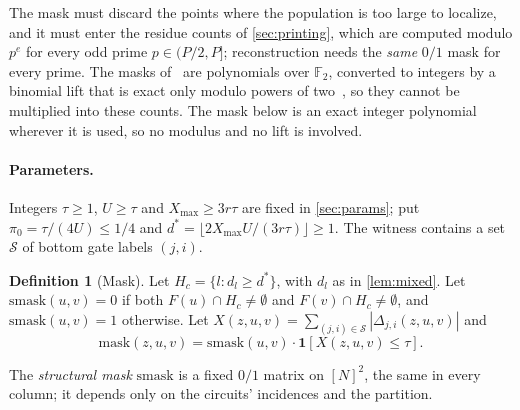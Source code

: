 \documentclass[11pt,letterpaper]{article}
\theoremstyle{definition}
\newtheorem{definition}{Definition}[section]
\theoremstyle{remark}
\newcommand{\F}{\mathbb F}
\newcommand{\smask}{\mathrm{smask}}
\newcommand{\mask}{\mathrm{mask}}
\newcommand{\ind}{\mathbf 1}
\newcommand{\cS}{\mathcal S}
\newcommand{\Xmax}{X_{\max}}
\begin{document}
The mask must discard the points where the population is too large to
localize, and it must enter the residue counts of
\cref{sec:printing}, which are computed modulo \(p^e\) for every odd
prime \(p\in(P/2,P]\); reconstruction needs the \emph{same} \(0/1\)
mask for every prime. The masks of~\cite[Appendix~D]{Nag72} are
polynomials over \(\F_2\), converted to integers by a binomial lift
that is exact only modulo powers of two~\cite[Lemma~C.7]{Nag72}, so
they cannot be multiplied into these counts. The mask below is an
exact integer polynomial wherever it is used, so no modulus and no
lift is involved.

\paragraph{Parameters.} Integers \(\tau\ge1\), \(U\ge\tau\) and
\(\Xmax\ge3r\tau\) are fixed in \cref{sec:params}; put
\(\pi_0=\tau/(4U)\le1/4\) and \(d^*=\lfloor2\Xmax U/(3r\tau)\rfloor\ge1\).
The witness contains a set \(\cS\) of bottom gate labels \((j,i)\).

\begin{definition}[Mask]\label{def:mask}
Let \(H_c=\{l:d_l\ge d^*\}\), with \(d_l\) as in \cref{lem:mixed}. Let
\(\smask(u,v)=0\) if both \(F(u)\cap H_c\ne\emptyset\) and
\(F(v)\cap H_c\ne\emptyset\), and \(\smask(u,v)=1\) otherwise. Let
\(X(z,u,v)=\sum_{(j,i)\in\cS}|\Delta_{j,i}(z,u,v)|\) and
\[
 \mask(z,u,v)=\smask(u,v)\cdot\ind[X(z,u,v)\le\tau].
\]
\end{definition}

The \emph{structural mask} \(\smask\) is a fixed \(0/1\) matrix on
\([N]^2\), the same in every column; it depends only on the circuits'
incidences and the partition.
\end{document}
